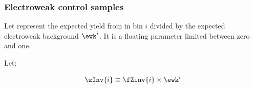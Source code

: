 %
%
%
%
%
%
%
%
%

\subsubsection{Electroweak control samples\label{sec:ewk}}

Let  represent the expected yield from \znunu in bin $i$
divided by the expected electroweak background $\ewk^{i}$.  It is
a floating parameter limited between zero and one.

Let:

\begin{equation}
  \zInv{i} \equiv \fZinv{i} \times \ewk^i 
  \label{eq:ZinvEwk}
\end{equation}

